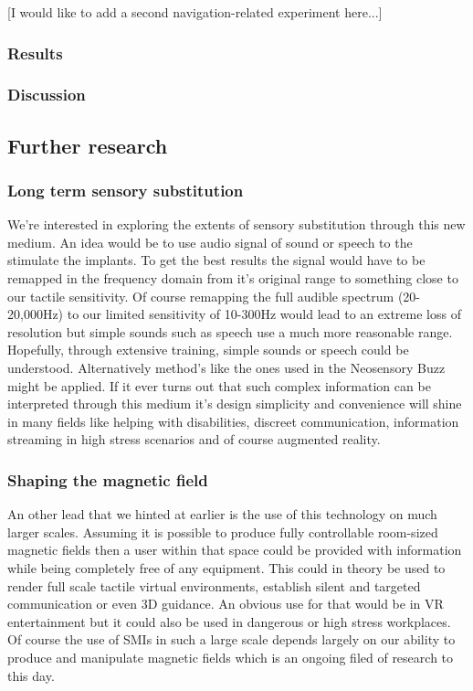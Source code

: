\documentclass[10pt,journal,compsoc]{IEEEtran}
\begin{document}
[I would like to add a second navigation-related experiment here...]
		
\subsubsection{Results}
		
\subsubsection{Discussion}
		
\subsection{Further research}

\subsubsection{Long term sensory substitution}
We're interested in exploring the extents of sensory substitution through this new medium. An idea would be to use audio signal of sound or speech to the stimulate the implants. To get the best results the signal would have to be remapped in the frequency domain from it's original range to something close to our tactile sensitivity. Of course remapping the full audible spectrum (20-20,000Hz) to our limited sensitivity of 10-300Hz would lead to an extreme loss of resolution but simple sounds such as speech use a much more reasonable range. Hopefully, through extensive training, simple sounds or speech could be understood. 
Alternatively method's like the ones used in the Neosensory Buzz \cite{perrotta2021neuroscience} might be applied.
If it ever turns out that such complex information can be interpreted through this medium it's design simplicity and convenience will shine in many fields like helping with disabilities, discreet communication, information streaming in high stress scenarios \cite{harrison2014thesis} and of course augmented reality.
\subsubsection{Shaping the magnetic field}
An other lead that we hinted at earlier is the use of this technology on much larger scales. Assuming it is possible to produce fully controllable room-sized magnetic fields then a user within that space could be provided with information while being completely free of any equipment. This could in theory be used to render full scale tactile virtual environments, establish silent and targeted communication or even 3D guidance. An obvious use for that would be in VR entertainment but it could also be used in dangerous or high stress workplaces.
Of course the use of SMIs in such a large scale depends largely on our ability to produce and manipulate magnetic fields which is an ongoing filed of research to this day. 
\end{document}

